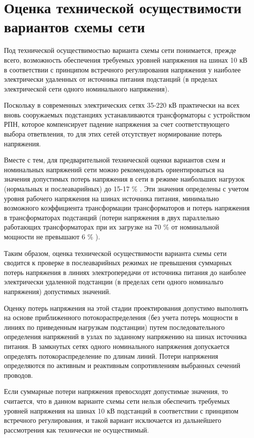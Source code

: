 \chapter{Оценка технической осуществимости вариантов схемы сети}
\label{cha:proverka_osush}

Под технической осуществимостью варианта схемы сети понимается, прежде всего, возможность обеспечения требуемых уровней напряжения на шинах 10 кВ в соответствии с принципом встречного регулирования напряжения у наиболее электрически удаленных от источника питания подстанций (в пределах электрической сети одного номинального напряжения).

Поскольку в современных электрических сетях 35-220 кВ практически на всех вновь сооружаемых подстанциях устанавливаются трансформаторы с устройством РПН, которое компенсирует падение напряжения за счет соответствующего выбора ответвления, то для этих сетей отсутствует нормирование потерь напряжения.

Вместе с тем, для предварительной технической оценки вариантов схем и номинальных напряжений сети можно рекомендовать ориентироваться на значения допустимых потерь напряжения в сети в режиме наибольших нагрузок (нормальных и послеаварийных) до 15-17 \% \cite{глазунов_шведов}. Эти значения определены с учетом уровня рабочего напряжения на шинах источника питания, минимально возможного коэффициента трансформации трансформаторов и потерь напряжения в трансформаторах подстанций (потери напряжения в двух параллельно работающих трансформаторах при их загрузке на 70 \% от номинальной мощности не превышают 6 \% \cite{глазунов_шведов}).

Таким образом, оценка технической осуществимости варианта схемы сети сводится к проверке в послеаварийных режимах не превышения суммарных потерь напряжения в линиях электропередачи от источника питания до наиболее электрически удаленной подстанции (в пределах сети одного номинальго напряжения) допустимых значений.

Оценку потерь напряжения на этой стадии проектирования допустимо выполнять на основе приближенного потокораспределения (без учета потерь мощности в линиях по приведенным нагрузкам подстанции) путем последовательного определения напряжений в узлах по заданному напряжению на шинах источника питания. В замкнутых сетях одного номинального напряжения допускается определять потокораспределение по длинам линий. Потери напряжения определяются по активным и реактивным сопротивлениям выбранных сечений проводов.

Если суммарные потери напряжения превосходят допустимые значения, то считается, что в данном варианте схемы сети нельзя обеспечить требуемых уровней напряжения на шинах 10 кВ подстанций в соответствии с принципом встречного регулирования, и такой вариант исключается из дальнейшего рассмотрения как технически не осуществимый.

